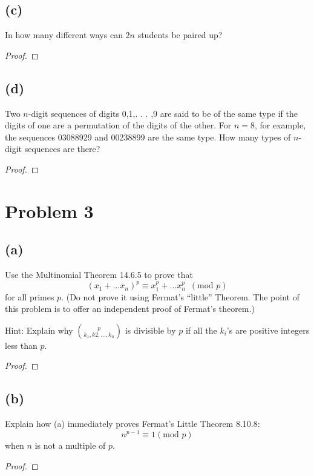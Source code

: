 \documentclass[14pt]{extarticle}
\begin{document}
\subsection{(c)}
In how many different ways can $2n$ students be paired up?
\begin{proof}
\end{proof}
\subsection{(d)}
Two $n$-digit sequences of digits 0,1,. . . ,9 are said to be of the same type if the digits of one are a permutation of the digits of the other. For $n = 8$, for example, the sequences 03088929 and 00238899 are the same type. How many types of $n$-digit sequences are there?
\begin{proof}
\end{proof}

\section{Problem 3}
\subsection{(a)}
Use the Multinomial Theorem 14.6.5 to prove that
$$
(x_1 + \ldots x_n)^p \equiv x_1^p + \ldots x_n^p \,\,\,(\text{mod}\,\,p)
$$
for all primes $p$. (Do not prove it using Fermat’s “little” Theorem. The point of this problem is to offer an independent proof of Fermat’s theorem.)

Hint: Explain why $\binom{p}{k_1, k 2, \ldots, k_n}$ is divisible by $p$ if all the $k_i$’s are positive integers less than $p$.
\begin{proof}
\end{proof}

\subsection{(b)}
Explain how (a) immediately proves Fermat’s Little Theorem 8.10.8: 
$$
n^{p-1} \equiv 1 (\text{mod }p)
$$
when $n$ is not a multiple of $p$.
\begin{proof}
\end{proof}
\end{document}
